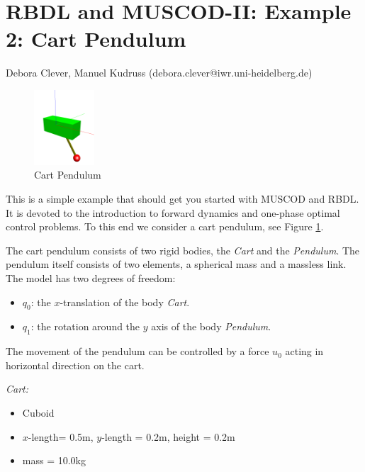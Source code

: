 \documentclass[a4paper,english,12pt]{report}
\newcommand{\rbdl}[0]{\textsc{RBDL}}
\newcommand{\muscod}[0]{\textsc{MUSCOD-II}}
\begin{document}
\thispagestyle{empty}


\section*{\rbdl{} and \muscod{}: Example 2: Cart Pendulum} 



Debora Clever, Manuel Kudruss  (debora.clever@iwr.uni-heidelberg.de)

\begin{figure}
	\begin{center}
		\includegraphics[width=0.2\textwidth]{cart_pendulum_base}
	\end{center}
	\caption{Cart Pendulum}
	\label{fig:cartpendulum}
\end{figure}

\bigskip
\bigskip

This is a simple example that should get you started with MUSCOD and RBDL. It is devoted to the introduction to forward dynamics and one-phase optimal control problems. To this end we consider a cart pendulum, see Figure \ref{fig:cartpendulum}.

The cart pendulum consists of two rigid bodies, the \emph{Cart} and the
\emph{Pendulum}. The pendulum itself consists of two elements, a spherical mass and a massless link. The model has two degrees of freedom:
\begin{itemize}
 \item $q_0$: the $x$-translation of the body \emph{Cart}.
 \item $q_1$: the rotation around the $y$ axis of the body \emph{Pendulum}.
\end{itemize}

\bigskip

The movement of the pendulum can be controlled by a force $u_0$ acting in horizontal direction on the cart. 

\bigskip

\emph{Cart:} 
\begin{itemize}
 \item Cuboid
 \item $x$-length= 0.5m, $y$-length = 0.2m, height = 0.2m
 \item mass = 10.0kg
\end{itemize}
\end{document}
